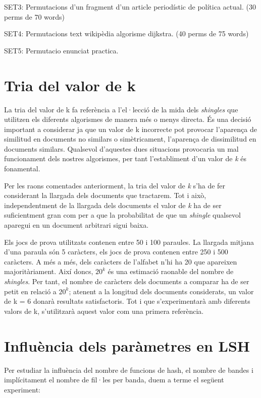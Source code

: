 \documentclass[catalan, 12pt]{report}
\begin{document}
SET3: Permutacions d'un fragment d'un article periodístic de política actual. (30 perms de 70 words)\newline

SET4: Permutacions text wikipèdia algorisme dijkstra. (40 perms de 75 words)

SET5: Permutacio enunciat practica.

\section{Tria del valor de k}

La tria del valor de k fa referència a l'el·lecció de la mida dels \textit{shingles} que utilitzen els diferents algorismes de manera més o menys directa. És una decisió important a considerar ja que un valor de k incorrecte pot provocar l'aparença de similitud en documents no similars o simètricament, l'aparença de dissimilitud en documents similars. Qualsevol d'aquestes dues situacions provocaria un mal funcionament dels nostres algorismes, per tant l'establiment d'un valor de \textit{k} és fonamental. \newline

Per les raons comentades anteriorment, la tria del valor de \textit{k} s'ha de fer considerant la llargada dels documents que tractarem. Tot i això, independentment de la llargada dels documents el valor de \textit{k} ha de ser suficientment gran com per a que la probabilitat de que un \textit{shingle} qualsevol aparegui en un document arbitrari sigui baixa. \newline

Els jocs de prova utilitzats contenen entre 50 i 100 paraules. La llargada mitjana d'una paraula són 5 caràcters, els jocs de prova contenen entre 250 i 500 caràcters. A més a més, dels caràcters de l'alfabet n'hi ha 20 que apareixen majoritàriament. Així doncs, \(  20^k \) és una estimació raonable del nombre de \textit{shingles}. Per tant, el nombre de caràcters dels documents a comparar ha de ser petit en relació a \(  20^k \); atenent a la longitud dels documents considerats, un valor de k = 6 donarà resultats satisfactoris. Tot i que s'experimentarà amb diferents valors de k, s'utilitzarà aquest valor com una primera referència.

\section{Influència dels paràmetres en LSH}

Per estudiar la influència del nombre de funcions de hash, el nombre de bandes i implícitament el nombre de fil·les per banda, duem a terme el següent experiment: \newline
\end{document}
